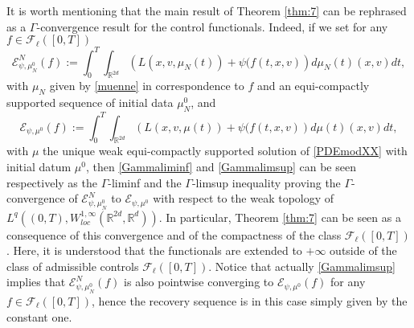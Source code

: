 \documentclass[11pt]{article}
\theoremstyle{plain}
\theoremstyle{definition}
\theoremstyle{remark}
\numberwithin{equation}{section}
\newcommand{\R}{{\mathbb R}}
\begin{document}
It is worth mentioning that the main result of Theorem \ref{thm:7} can be rephrased as a $\Gamma$-convergence result for the control functionals.
Indeed, if we set for any $f\in\mathcal F_\ell([0,T])$
\begin{equation}\label{mainmod2+}
\mathcal E_{\psi, \mu_N^0}^N(f) := \int_{0}^T \int_{\mathbb R^{2d}} \left ( L(x,v,\mu_N(t)) + \psi(f(t,x,v) \right ) d \mu_N(t)(x,v) dt,
\end{equation} 
with $\mu_N$ given by \eqref{muenne} in correspondence to $f$ and an equi-compactly supported sequence of initial data $\mu^0_N$, and
\begin{equation}\label{mainmod3+}
\mathcal E_{\psi, \mu^0}(f) := \int_{0}^T \int_{\mathbb R^{2d}} \left ( L(x,v,\mu(t)) + \psi(f(t,x,v) \right ) d \mu(t)(x,v) dt,
\end{equation} 
with $\mu$ the unique weak equi-compactly supported solution of \eqref{PDEmodXX} with initial datum $\mu^0$, then \eqref{Gammaliminf} and \eqref{Gammalimsup} can be seen respectively as the $\Gamma$-liminf and the $\Gamma$-limsup inequality proving the $\Gamma$-convergence of $\mathcal E_{\psi,\mu_N^0}^N$ to $\mathcal E_{\psi,\mu^0}$ with respect to the weak topology of $L^q((0,T), W^{1,\infty}_{loc}(\R^{2d}, \R^d))$. In particular, Theorem \ref{thm:7} can be seen as a consequence of this convergence and of the compactness of the class $\mathcal F_\ell([0,T])$. Here, it is understood that the functionals are extended to $+\infty$ outside of the class of admissible controls $\mathcal F_\ell([0,T])$.  Notice that actually \eqref{Gammalimsup} implies that $\mathcal E_{\psi, \mu_N^0}^N(f)$ is also pointwise converging to $\mathcal E_{\psi,\mu^0}(f)$ for  any $f\in \mathcal F_\ell([0,T])$, hence the recovery sequence is in this case simply given by the constant one.
\end{document}
